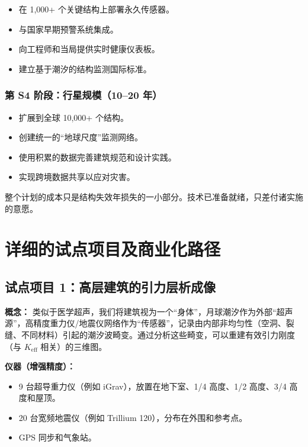 \documentclass[12pt,a4paper]{article}
\theoremstyle{remark}
\newcommand{\Keff}{K_{\mathrm{eff}}}
\begin{document}
	\begin{itemize}
		\item 在 1,000+ 个关键结构上部署永久传感器。
		\item 与国家早期预警系统集成。
		\item 向工程师和当局提供实时健康仪表板。
		\item 建立基于潮汐的结构监测国际标准。
	\end{itemize}
	
	\subsubsection{第 S4 阶段：行星规模（10–20 年）}
	
	\begin{itemize}
		\item 扩展到全球 10,000+ 个结构。
		\item 创建统一的“地球尺度”监测网络。
		\item 使用积累的数据完善建筑规范和设计实践。
		\item 实现跨境数据共享以应对灾害。
	\end{itemize}
	
	整个计划的成本只是结构失效年损失的一小部分。技术已准备就绪，只差付诸实施的意愿。
	
	\section{详细的试点项目及商业化路径}
	
	\subsection{试点项目 1：高层建筑的引力层析成像}
	
	\textbf{概念：} 类似于医学超声，我们将建筑视为一个“身体”，月球潮汐作为外部“超声源”，高精度重力仪/地震仪网络作为“传感器”，记录由内部非均匀性（空洞、裂缝、不同材料）引起的潮汐波畸变。通过分析这些畸变，可以重建有效引力刚度（与 $\Keff$ 相关）的三维图。
	
	\textbf{仪器（增强精度）：}
	\begin{itemize}
		\item 9 台超导重力仪（例如 iGrav），放置在地下室、1/4 高度、1/2 高度、3/4 高度和屋顶。
		\item 20 台宽频地震仪（例如 Trillium 120），分布在外围和参考点。
		\item GPS 同步和气象站。
	\end{itemize}
	
\end{document}
